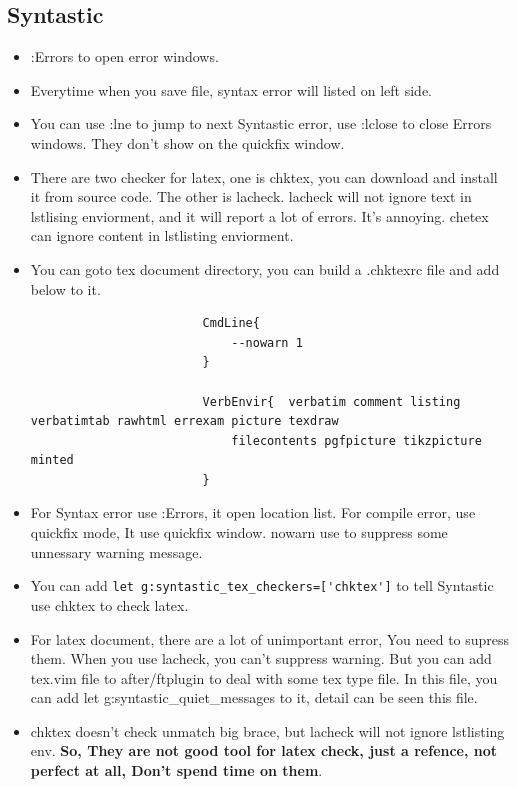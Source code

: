 \documentclass[paper=8.5in:11in, twoside, 12pt, pagesize=pdftex]{book}
\begin{document}
				\subsection{Syntastic}
				\begin{itemize}
					\item :Errors to open error windows. 
					
					\item Everytime when you save file, syntax error will listed on left side.
					
					\item You can use :lne to jump to next Syntastic error, use :lclose to close Errors windows. They don't show on the quickfix window. 
					
					\item There are two checker for latex, one is chktex, you can download and install it from source code. The other is lacheck. lacheck will not ignore text in lstlising enviorment, and it will report a lot of errors. It's annoying. chetex can ignore content in lstlisting enviorment.
					
					\item You can goto tex document directory, you can build a .chktexrc file and add below to it. 
					\begin{verbatim}
						CmdLine{
							--nowarn 1
						}
						
						VerbEnvir{  verbatim comment listing verbatimtab rawhtml errexam picture texdraw
							filecontents pgfpicture tikzpicture minted
						}
					\end{verbatim} 
					
					\item For Syntax error use :Errors, it open location list.  For compile error, use quickfix mode, It use quickfix window.   nowarn use to suppress some unnessary warning message.
					
					\item You can add \verb!let g:syntastic_tex_checkers=['chktex']! to tell Syntastic use chktex to check latex.
					
					\item For latex document, there are a lot of unimportant error, You need to supress them. When you use lacheck, you can't suppress warning. But you can add tex.vim file to after/ftplugin to deal with some tex type file. In this file, you can add let g:syntastic\_quiet\_messages to it, detail can be seen this file.
					
					\item chktex doesn't check unmatch big brace, but lacheck will not ignore lstlisting env. \textbf{So, They are not good tool for latex check, just a refence, not perfect at all, Don't spend time on them}.
					

\end{itemize}
\end{document}
